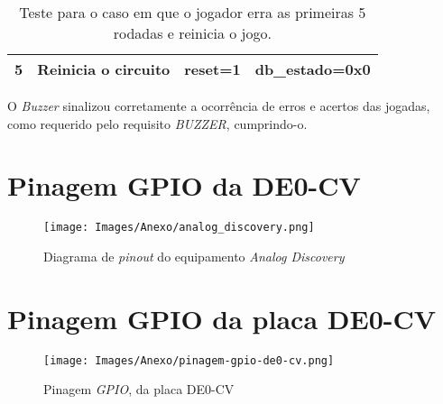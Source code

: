 \documentclass[amsmath,amssymb,floatfix]{report}
\makeatletter
\newcommand{\annexname}{Anexo}
\newcommand\annex{\par
  \setcounter{chapter}{0}%
  \setcounter{section}{0}%
  \gdef\@chapapp{\annexname}%
  \gdef\thechapter{\@Roman\c@chapter}}
\makeatother
\begin{document}
\begin{table}[H]
\begin{tabular}{|cccc|}
\multicolumn{1}{|c|}{5}          & \multicolumn{1}{c|}{Reinicia o circuito} & \multicolumn{1}{c|}{reset=1}                                                            & \multicolumn{1}{c|}{db\_estado=0x0}              \\ \hline
\end{tabular}
\caption{Teste para o caso em que o jogador erra as primeiras 5 rodadas e reinicia o jogo.}
\label{tab:testbench22_exp}
\end{table}

O \textit{Buzzer} sinalizou corretamente a ocorrência de erros e acertos das jogadas, como requerido pelo requisito \textit{BUZZER}, cumprindo-o.

\annex
\chapter{Pinagem GPIO da DE0-CV}
\label{annex:analogDiscovery}

\begin{figure}[H]
\centering
\texttt{[image: Images/Anexo/analog\_discovery.png]} 
    \caption{Diagrama de \textit{pinout} do equipamento \textit{Analog Discovery}}
    \label{fig:analogdiscovery}
\end{figure}

\chapter{Pinagem GPIO da placa DE0-CV}
\label{annex:gpio}

\begin{figure}[H]
\centering
\texttt{[image: Images/Anexo/pinagem-gpio-de0-cv.png]} 
    \caption{Pinagem \textit{GPIO}, da placa DE0-CV}
    \label{fig:gpio}
\end{figure}

\end{document}
